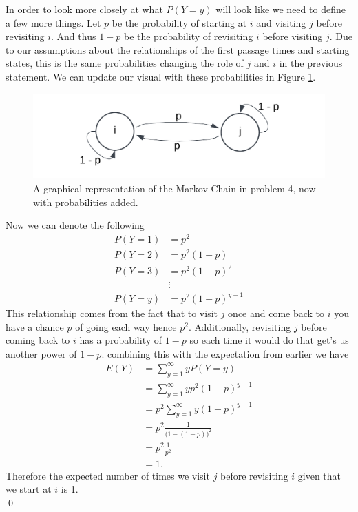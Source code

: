 \documentclass[10pt]{amsart}
\begin{document}
In order to look more closely at what $P(Y = y)$ will look like we need to define a few more things.
Let $p$ be the probability of starting at $i$ and visiting $j$ before revisiting $i$. And thus $1-p$ be the probability of revisiting $i$ before visiting $j$.
Due to our assumptions about the relationships of the first passage times and starting states, this is the same probabilities changing the role of $j$ and $i$ in the previous statement.
We can update our visual with these probabilities in Figure \ref{fig:f7}.
\begin{figure}[h]
	\centering
	\includegraphics[scale=0.85]{four_with_prob_markov_graph.png}
	\caption{
		A graphical representation of the Markov Chain in problem 4, now with probabilities added.
	}\label{fig:f7}
\end{figure}
Now we can denote the following
\begin{align*}
P(Y = 1) &= p^2 \\
P(Y = 2) &= p^2(1 - p) \\
P(Y = 3) &= p^2(1 - p)^2 \\
& \vdots \\
P(Y = y) &= p^2(1 - p)^{y - 1}
\end{align*}
This relationship comes from the fact that to visit $j$ once and come back to $i$ you have a chance $p$ of going each way hence $p^2$.
Additionally, revisiting $j$ before coming back to $i$ has a probability of $1 - p$ so each time it would do that get's us another power of $1 - p$. combining this with the expectation from earlier we have
\begin{align*}
E(Y) &= \sum_{y=1}^\infty yP(Y = y) \\
	&= \sum_{y=1}^\infty yp^2 (1 - p)^{y- 1} \\
	&= p^2 \sum_{y = 1}^\infty y(1 - p)^{y - 1} \\
	&= p^2 \frac 1 {\big(1 - (1 - p)\big)^2} \\
	&= p^2 \frac 1 {p^2} \\
	&= 1.
\end{align*}
Therefore the expected number of times we visit $j$ before revisiting $i$ given that we start at $i$ is 1. \\
\qed \\
\end{document}
